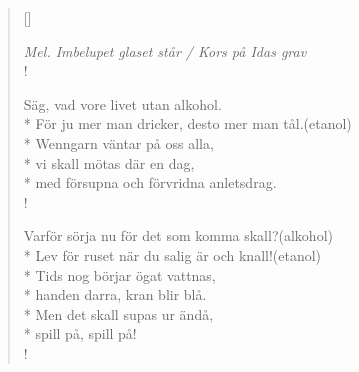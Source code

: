\settowidth{\versewidth}{Wenngarn väntar på oss alla,}


\begin{verse}[\versewidth]

\flagverse{}
\emph{Mel. Imbelupet glaset står / Kors på Idas grav}\\!

Säg, vad vore livet utan alkohol.\\* 
För ju mer man dricker, desto mer man tål.(etanol)\\*
Wenngarn väntar på oss alla,\\*
vi skall mötas där en dag,\\*
med försupna och förvridna anletsdrag.\\!


Varför sörja nu för det som komma skall?(alkohol)\\*
Lev för ruset när du salig är och knall!(etanol) \\*
Tids nog börjar ögat vattnas,\\*
handen darra, kran blir blå.\\*
Men det skall supas ur ändå,\\*
spill på, spill på! \\!


\end{verse}

